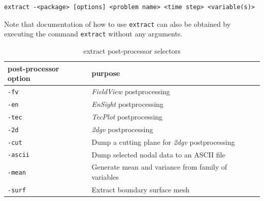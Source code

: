 \documentclass{article}
\begin{document}
\begin{verbatim}
extract -<package> [options] <problem name> <time step> <variable(s)>
\end{verbatim}

Note that documentation of how to use {\tt extract} can also be obtained by
executing the command {\tt extract} without any arguments.


\begin{table}[htbp]
  \begin{center}
    \leavevmode
    \begin{tabular}{|l|l|}
      \hline
      post-processor option & purpose \\
      \hline
      {\tt -fv} & {\it FieldView} postprocessing\\
      {\tt -en} & {\it EnSight} postprocessing\\
      {\tt -tec} & {\it TecPlot} postprocessing\\
      {\tt -2d} & {\it 2dgv} postprocessing\\
      {\tt -cut} & Dump a cutting plane for {\it 2dgv} postprocessing\\
      {\tt -ascii} & Dump selected nodal data to an ASCII file\\
      {\tt -mean} & Generate mean and variance from family of variables\\
      {\tt -surf} & Extract boundary surface mesh\\
      \hline
    \end{tabular}
    
    \caption{extract post-processor selectors}
    \label{tab:extractpost}
  \end{center}
\end{table}
\end{document}
